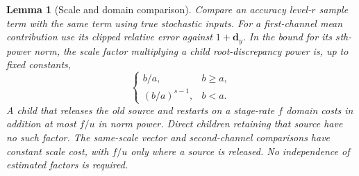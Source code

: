 \documentclass[11pt]{article}
\numberwithin{equation}{section}
\newtheorem{lemma}[theorem]{Lemma}
\theoremstyle{definition}
\theoremstyle{remark}
\begin{document}
\begin{lemma}[Scale and domain comparison]\label{lem:est-mean-comparison}
Compare an accuracy level-${r}$ sample term with the same term using true stochastic
inputs.  For a first-channel mean contribution use its clipped relative
error against $1+{\mathbf{d}}_y$.  In the bound for its $s$th-power norm, the scale
factor multiplying a child root-discrepancy power is, up to fixed constants,
\[
 \begin{cases}
 b/a,&b\ge a,\\
 (b/a)^{s-1},&b<a.
 \end{cases}
\]
A child that releases the old source and restarts on a stage-rate $f$
domain costs in addition at most $f/u$ in norm power.  Direct children
retaining that source have no such factor.  The same-scale vector and
second-channel comparisons have constant scale cost, with $f/u$ only
where a source is released.  No independence of estimated factors is
required.
\end{lemma}
\end{document}
